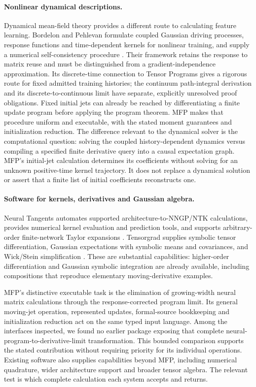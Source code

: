 \paragraph{Nonlinear dynamical descriptions.}
Dynamical mean-field theory provides a different route to calculating feature
learning. Bordelon and Pehlevan formulate coupled Gaussian driving processes,
response functions and time-dependent kernels for nonlinear training, and
supply a numerical self-consistency procedure \cite{bordelon2023dmft}.
Their framework retains the response to matrix reuse and must be distinguished
from a gradient-independence approximation. Its discrete-time connection to
Tensor Programs gives a rigorous route for fixed admitted training histories;
the continuum path-integral derivation and its discrete-to-continuous limit
have separate, explicitly unresolved proof obligations. Fixed initial jets
can already be reached by differentiating a finite update program before
applying the program theorem. MFP makes that procedure uniform and executable,
with the stated moment guarantees and initialization reduction.
The difference relevant to the dynamical solver is the
computational question: solving the coupled history-dependent dynamics versus
compiling a specified finite derivative query into a causal expectation graph.
MFP's initial-jet calculation determines its coefficients without solving for
an unknown positive-time kernel trajectory. It does not replace a dynamical
solution or assert that a finite list of initial coefficients reconstructs one.

\paragraph{Software for kernels, derivatives and Gaussian algebra.}
Neural Tangents automates supported architecture-to-NNGP/NTK calculations,
provides numerical kernel evaluation and prediction tools, and supports
arbitrary-order finite-network Taylor expansions
\cite{novak2020neuraltangents}. Tensorgrad supplies symbolic tensor
differentiation, Gaussian expectations with symbolic means and covariances,
and Wick/Stein simplification \cite{ahle2026tensorgrad}. These are substantial
capabilities: higher-order differentiation and Gaussian symbolic integration
are already available, including compositions that reproduce elementary
moving-derivative examples.

MFP's distinctive executable task is the elimination of growing-width neural
matrix calculations through the response-corrected program limit. Its general
moving-jet operation, represented updates, formal-source bookkeeping and
initialization reduction act on the same typed input language. Among the
interfaces inspected, we found no earlier package exposing that complete
neural-program-to-derivative-limit transformation. This bounded comparison
supports the stated contribution without requiring priority for its individual
operations. Existing software also supplies capabilities beyond MFP, including
numerical quadrature, wider architecture support and broader tensor algebra.
The relevant test is which complete calculation each system accepts and returns.
